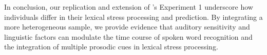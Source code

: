In conclusion, our replication and extension of \cite{Sulpizio_McQueen_2012}'s Experiment 1 underscore how individuals differ in their lexical stress processing and prediction. By integrating a more heterogeneous sample, we provide evidence that auditory sensitivity and linguistic factors can modulate the time course of spoken word recognition and the integration of multiple prosodic cues in lexical stress processing. 